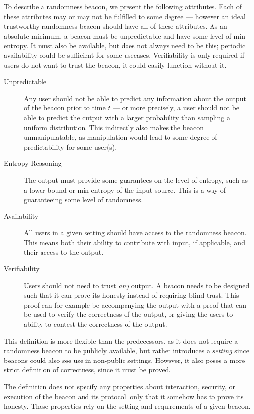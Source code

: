 To describe a randomness beacon, we present the following attributes.
Each of these attributes may or may not be fulfilled to some degree --- however an ideal trustworthy randomness beacon should have all of these attributes. As an absolute minimum, a beacon must be unpredictable and have some level of min-entropy. It must also be available, but does not always need to be this; periodic availability could be sufficient for some usecases. Verifiability is only required if users do not want to trust the beacon, it could easily function without it.

\begin{description}
    \item[Unpredictable]
        Any user should not be able to predict any information about the output of the beacon prior to time $t$ --- or more precisely, a user should not be able to predict the output with a larger probability than sampling a uniform distribution.
        This indirectly also makes the beacon unmanipulatable, as manipulation would lead to some degree of predictability for some user(s).
    \item[Entropy Reasoning]
		The output must provide some guarantees on the level of entropy, such as a lower bound or min-entropy of the input source.
        This is a way of guaranteeing some level of randomness.
    \item[Availability]
        All users in a given setting should have access to the randomness beacon.
        This means both their ability to contribute with input, if applicable, and their access to the output.
    \item[Verifiability]
        Users should not need to trust \emph{any} output.
        A beacon needs to be designed such that it can prove its honesty instead of requiring blind trust.
        This proof can for example be accompanying the output with a proof that can be used to verify the correctness of the output, or giving the users to ability to contest the correctness of the output.
\end{description}

This definition is more flexible than the predecessors, as it does not require a randomness beacon to be publicly available, but rather introduces a \emph{setting} since beacons could also see use in non-public settings.
However, it also poses a more strict definition of correctness, since it must be proved.

The definition does not specify any properties about interaction, security, or execution of the beacon and its protocol, only that it somehow has to prove its honesty.
These properties rely on the setting and requirements of a given beacon.
